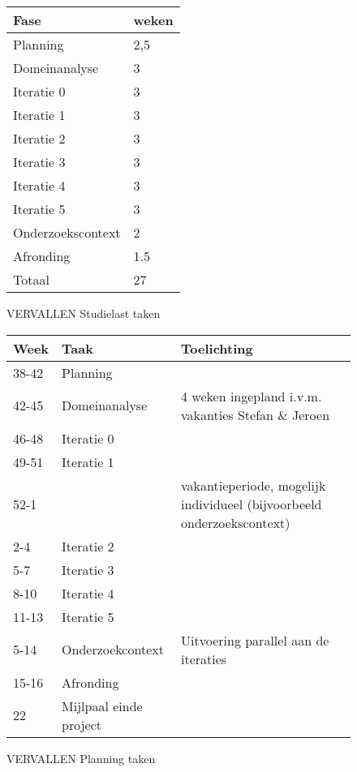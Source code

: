 \begin{figure}[h]
{\gray
\begin{tabular}{ll}\hline
{\bf Fase}    & {\bf weken}\\\hline
Planning             & 2,5 \\
Domeinanalyse        & 3 \\
\hline
Iteratie 0           & 3 \\
Iteratie 1           & 3 \\
Iteratie 2           & 3 \\
Iteratie 3           & 3 \\
Iteratie 4           & 3 \\
Iteratie 5           & 3 \\
\hline
Onderzoekscontext     &	2 \\
Afronding	     & 1.5 \\
\hline
Totaal               & 27 \\
\end{tabular}
}%
\caption{\textsc{VERVALLEN} Studielast taken}
\end{figure}

\begin{figure}[h]
{\gray
\begin{tabular}{llp{7cm}}\hline
{\bf Week}    & {\bf Taak}  & {\bf Toelichting}\\\hline
38-42         & Planning    \\
42-45         & Domeinanalyse & 4 weken ingepland i.v.m. vakanties Stefan \& Jeroen \\
46-48         & Iteratie 0    \\
49-51         & Iteratie 1    \\
52-1          &               & vakantieperiode, mogelijk
				individueel (bijvoorbeeld onderzoekscontext) \\
2-4           & Iteratie 2    \\
5-7           & Iteratie 3    \\
8-10          & Iteratie 4    \\
11-13         & Iteratie 5    \\

5-14          & Onderzoekcontext & Uitvoering parallel aan de iteraties \\
15-16         & Afronding     \\

22            & Mijlpaal einde project
\end{tabular}
}%
\caption{\textsc{VERVALLEN} Planning taken}
\end{figure}

